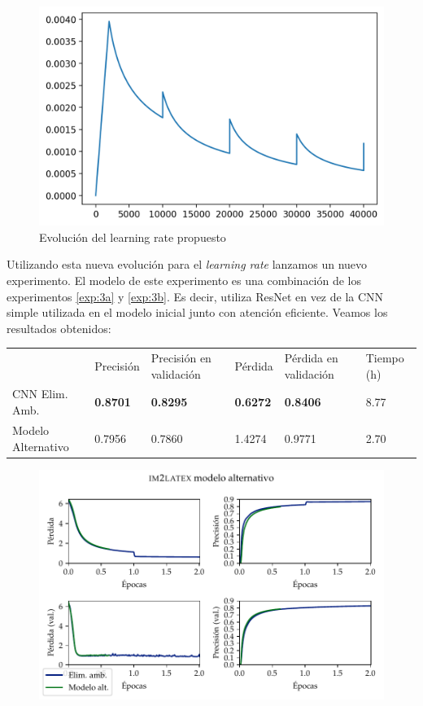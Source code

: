 \documentclass[a4paper, 20pt, dvipsnames]{article}
\begin{document}
\begin{figure}[H]
	\centering
	\includegraphics[scale=0.5]{fig/learning-rate2}
	\caption{Evolución del learning rate propuesto}
\end{figure}

Utilizando esta nueva evolución para el \emph{learning rate} lanzamos un nuevo
experimento. El modelo de este experimento es una combinación de los experimentos
\ref{exp:3a} y \ref{exp:3b}. Es decir, utiliza ResNet en vez de la CNN simple
utilizada en el modelo inicial junto con atención eficiente. Veamos los resultados
obtenidos:

\begin{table}[H]
	\centering
	\begin{tabular}{llllll}
		& Precisión       & Precisión en validación & Pérdida         & Pérdida en validación & Tiempo (h) \\ \cline{2-6} 
		CNN Elim. Amb.     & \textbf{0.8701} & \textbf{0.8295}         & \textbf{0.6272} & \textbf{0.8406}       & 8.77       \\
		Modelo Alternativo & 0.7956          & 0.7860                  & 1.4274          & 0.9771                & 2.70      
	\end{tabular}
\end{table}

\begin{figure}[H]
	\centering
	\includegraphics{fig/im2latex-alternativo.pdf}
\end{figure}
\end{document}
